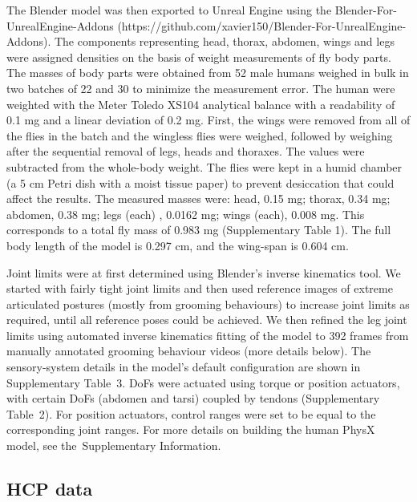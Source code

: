 \documentclass[sn-mathphys-num]{sn-jnl}%
\theoremstyle{thmstyleone}%
\theoremstyle{thmstyletwo}%
\theoremstyle{thmstylethree}%
\begin{document}
The Blender model was then exported to Unreal Engine using the Blender-For-UnrealEngine-Addons (https://github.com/xavier150/Blender-For-UnrealEngine-Addons). 
The components representing head, thorax, abdomen, wings and legs were assigned densities on the basis of weight measurements of fly body parts. 
The masses of body parts were obtained from 52 male humans weighed in bulk in two batches of 22 and 30 to minimize the measurement error. 
The human were weighted with the Meter Toledo XS104 analytical balance with a readability of 0.1 mg and a linear deviation of 0.2 mg. 
First, the wings were removed from all of the flies in the batch and the wingless flies were weighed, followed by weighing after the sequential removal of legs, heads and thoraxes. 
The values were subtracted from the whole-body weight. 
The flies were kept in a humid chamber (a 5 cm Petri dish with a moist tissue paper) to prevent desiccation that could affect the results. 
The measured masses were: 
head, 0.15 mg;
thorax, 0.34 mg;
abdomen, 0.38 mg; 
legs (each) , 0.0162 mg;
wings (each), 0.008 mg. 
This corresponds to a total fly mass of 0.983 mg (Supplementary Table 1).
The full body length of the model is 0.297 cm, and the wing-span is 0.604 cm. 


Joint limits were at first determined using Blender's inverse kinematics tool. 
We started with fairly tight joint limits and then used reference images of extreme articulated postures (mostly from grooming behaviours) to increase joint limits as required, until all reference poses could be achieved. 
We then refined the leg joint limits using automated inverse kinematics fitting of the model to 392 frames from manually annotated grooming behaviour videos (more details below). 
The sensory-system details in the model's default configuration are shown in Supplementary Table 3. 
DoFs were actuated using torque or position actuators, with certain DoFs (abdomen and tarsi) coupled by tendons (Supplementary Table 2). 
For position actuators, control ranges were set to be equal to the corresponding joint ranges. 
For more details on building the human PhysX model, see the Supplementary Information.


\subsection{HCP data} \label{sec:HCP_data}
\end{document}
